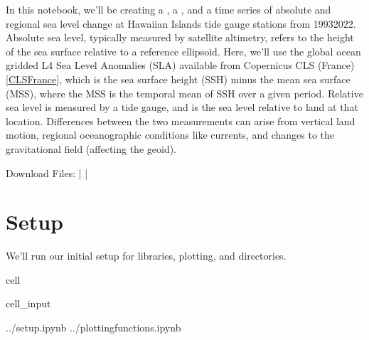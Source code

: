 \documentclass[letterpaper,10pt,english]{jupyterBook}
\begin{document}
\sphinxAtStartPar
In this notebook, we’ll be creating a {\hyperref[\detokenize{notebooks/regional_and_local/SL_Trend:create-a-table}]{}}, a {\hyperref[\detokenize{notebooks/regional_and_local/SL_Trend:fig-mag}]{}}, and a time series {\hyperref[\detokenize{notebooks/regional_and_local/SL_Trend:trend-fig}]{}} of absolute and regional sea level change at Hawaiian Islands tide gauge stations from 1993\sphinxhyphen{}2022. Absolute sea level, typically measured by satellite altimetry, refers to the height of the sea surface relative to a reference ellipsoid. Here, we’ll use the global ocean gridded L4 Sea Level Anomalies (SLA) available from Copernicus CLS (France) {[}\hyperlink{cite.notebooks/regional_and_local/SL_Trend:id10}{CLSFrance}{]}, which is the sea surface height (SSH) minus the mean sea surface (MSS), where the MSS is the temporal mean of SSH over a given period. Relative sea level is measured by a tide gauge, and is the sea level relative to land at that location. Differences between the two measurements can arise from vertical land motion, regional oceanographic conditions like currents, and changes to the gravitational field (affecting the geoid).

\sphinxAtStartPar
Download Files:
 |
 |


\chapter{Setup}
\label{\detokenize{notebooks/regional_and_local/SL_Trend:setup}}
\sphinxAtStartPar
We’ll run our initial setup for libraries, plotting, and directories.

\begin{sphinxuseclass}{cell}\begin{sphinxVerbatimInput}

\begin{sphinxuseclass}{cell_input}
\begin{sphinxVerbatim}[commandchars=\\\{\}]
 ../setup.ipynb  
 ../plotting\PYGZus{}functions.ipynb
   
   
\end{sphinxVerbatim}

\end{sphinxuseclass}\end{sphinxVerbatimInput}

\end{sphinxuseclass}
\end{document}
